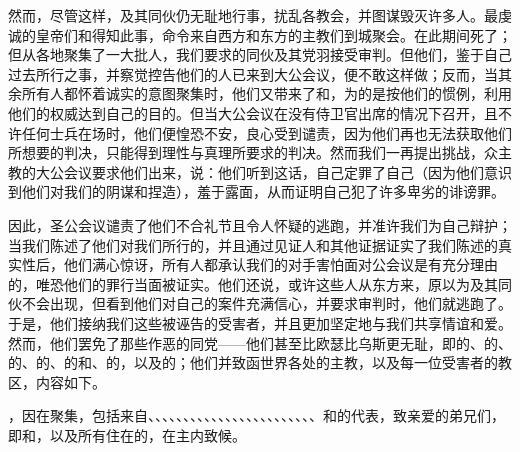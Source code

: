然而，尽管这样，及其同伙仍无耻地行事，扰乱各教会，并图谋毁灭许多人。最虔诚的皇帝们和得知此事，命令来自西方和东方的主教们到城聚会。在此期间死了；但从各地聚集了一大批人，我们要求的同伙及其党羽接受审判。但他们，鉴于自己过去所行之事，并察觉控告他们的人已来到大公会议，便不敢这样做；反而，当其余所有人都怀着诚实的意图聚集时，他们又带来了和，为的是按他们的惯例，利用他们的权威达到自己的目的。但当大公会议在没有侍卫官出席的情况下召开，且不许任何士兵在场时，他们便惶恐不安，良心受到谴责，因为他们再也无法获取他们所想要的判决，只能得到理性与真理所要求的判决。然而我们一再提出挑战，众主教的大公会议要求他们出来，说：他们听到这话，自己定罪了自己（因为他们意识到他们对我们的阴谋和捏造），羞于露面，从而证明自己犯了许多卑劣的诽谤罪。\par

因此，圣公会议谴责了他们不合礼节且令人怀疑的逃跑，并准许我们为自己辩护；当我们陈述了他们对我们所行的，并且通过见证人和其他证据证实了我们陈述的真实性后，他们满心惊讶，所有人都承认我们的对手害怕面对公会议是有充分理由的，唯恐他们的罪行当面被证实。他们还说，或许这些人从东方来，原以为及其同伙不会出现，但看到他们对自己的案件充满信心，并要求审判时，他们就逃跑了。于是，他们接纳我们这些被诬告的受害者，并且更加坚定地与我们共享情谊和爱。然而，他们罢免了那些作恶的同党——他们甚至比欧瑟比乌斯更无耻，即的、的、的、的、的和、的，以及的；他们并致函世界各处的主教，以及每一位受害者的教区，内容如下。\par

\par

，因在聚集，包括来自、、、、、、、、、、、、、、、、、、、、、、、、和的代表，致亲爱的弟兄们，即和，以及所有住在的，在主内致候。\par

